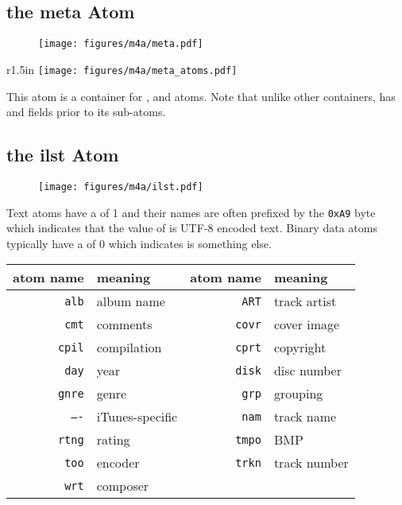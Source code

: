 \subsection{the meta Atom}
\label{m4a_meta}
\begin{figure}[h]
  \texttt{[image: figures/m4a/meta.pdf]}
\end{figure}
\begin{wrapfigure}[3]{r}{1.5in}
  \texttt{[image: figures/m4a/meta\_atoms.pdf]}
\end{wrapfigure}
\par
\noindent
This atom is a container for ,  and  atoms.
Note that unlike other containers,  has 
and  fields prior to its sub-atoms.

\clearpage

\subsection{the ilst Atom}
\begin{figure}[h]
  \texttt{[image: figures/m4a/ilst.pdf]}
\end{figure}
\par
\noindent
Text  atoms have a  of 1
and their names are often prefixed by the \texttt{0xA9} byte
which indicates that the value of  is UTF-8 encoded text.
Binary data atoms typically have a  of 0
which indicates  is something else.
\begin{table}[h]
  \begin{tabular}{rlrl}
    \textsf{atom name} & meaning & \textsf{atom name} & meaning \\
    \hline
    \texttt{alb} & album name & \texttt{ART} & track artist \\
    \texttt{cmt} & comments & \texttt{covr} & cover image \\
    \texttt{cpil} & compilation & \texttt{cprt} & copyright \\
    \texttt{day} & year & \texttt{disk} & disc number \\
    \texttt{gnre} & genre & \texttt{grp} & grouping \\
    \texttt{----} & iTunes-specific & \texttt{nam} & track name \\
    \texttt{rtng} & rating & \texttt{tmpo} & BMP \\
    \texttt{too} & encoder & \texttt{trkn} & track number \\
    \texttt{wrt} & composer \\
  \end{tabular}
\end{table}

